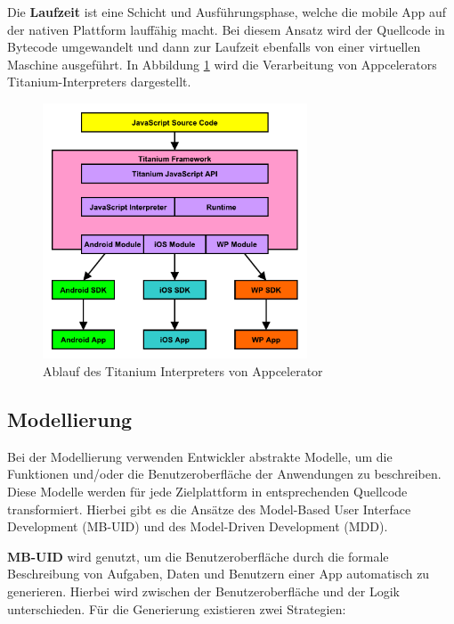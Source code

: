 \pagebreak

\bigskip
Die \textbf{Laufzeit} ist eine Schicht und Ausführungsphase, welche die mobile App auf der nativen Plattform lauffähig macht. Bei diesem Ansatz wird der Quellcode in Bytecode umgewandelt und dann zur Laufzeit ebenfalls von einer virtuellen Maschine ausgeführt. In Abbildung \ref{graph_interpreter_Titanium} wird die Verarbeitung von Appcelerators Titanium-Interpreters dargestellt.

\begin{figure}[htbp]
	\centering
	\includegraphics[width=0.7\textwidth]{Bilder/Interpretation_Runtime_Titanium}
	\caption{Ablauf des Titanium Interpreters von Appcelerator}\label{graph_interpreter_Titanium}
\end{figure}

\subsection{Modellierung}
Bei der Modellierung verwenden Entwickler abstrakte Modelle, um die Funktionen und/oder die Benutzeroberfläche der Anwendungen zu beschreiben. Diese Modelle werden für jede Zielplattform in entsprechenden Quellcode transformiert. Hierbei gibt es die Ansätze des Model-Based User Interface Development (MB-UID) und des Model-Driven Development (MDD).

\bigskip
\textbf{MB-UID} wird genutzt, um die Benutzeroberfläche durch die formale Beschreibung von Aufgaben, Daten und Benutzern einer App automatisch zu generieren. Hierbei wird zwischen der Benutzeroberfläche und der Logik unterschieden.
Für die Generierung existieren zwei Strategien:

